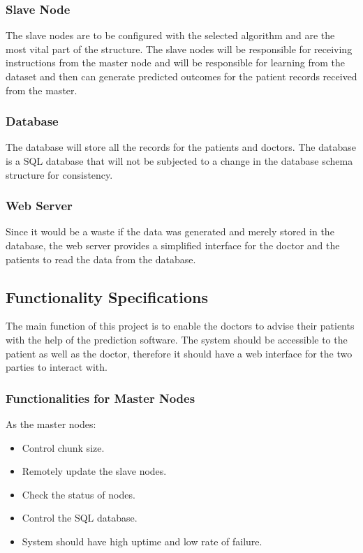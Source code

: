 \documentclass[12pt]{article}
\begin{document}
\subsubsection{Slave Node}
The slave nodes are to be configured with the selected algorithm and are the most vital part of the structure. The slave nodes will be responsible for receiving instructions from the master node and will be responsible for learning from the dataset and then can generate predicted outcomes for the patient records received from the master. 

\subsubsection{Database}
The database will store all the records for the patients and doctors. The database is a SQL database that will not be subjected to a change in the database schema structure for consistency.

\subsubsection{Web Server}
Since it would be a waste if the data was generated and merely stored in the database, the web server provides a simplified interface for the doctor and the patients to read the data from the database.

\clearpage
\newpage
\subsection{Functionality Specifications}
The main function of this project is to enable the doctors to advise their patients with the help of the prediction software. The system should be accessible to the patient as well as the doctor, therefore it should have a web interface for the two parties to interact with.

\subsubsection{Functionalities for Master Nodes}
As the master nodes:
\begin{itemize}
\item Control chunk size.
\item Remotely update the slave nodes.
\item Check the status of nodes.
\item Control the SQL database.
\item System should have high uptime and low rate of failure.
\end{itemize}
\end{document}
